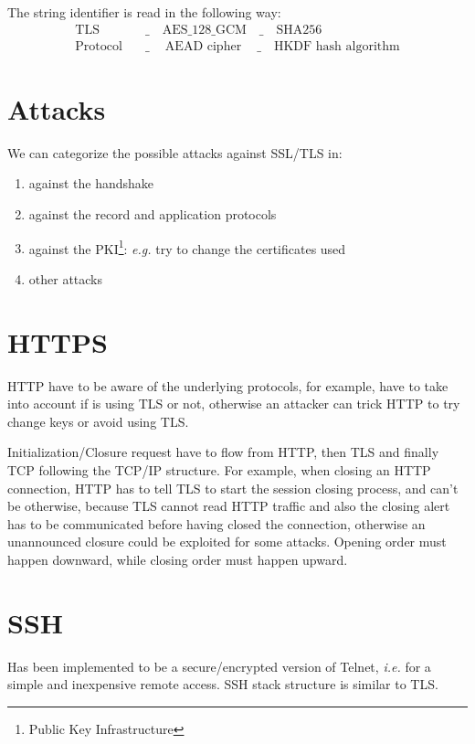 \documentclass[oneside]{academica}
\begin{document}
The string identifier is read in the following way:
\begin{align*}
  \text{TLS} \quad & \_ \quad \text{AES\_128\_GCM} \quad \_ \quad \text{SHA256} \\
  \text{Protocol} \quad & \_ \quad \ \text{AEAD cipher} \quad \ \_ \quad \text{HKDF hash algorithm}
\end{align*}

\section{Attacks}

We can categorize the possible attacks against SSL/TLS in:
\begin{enumerate}
  \item against the handshake
  \item against the record and application protocols
  \item against the PKI\footnote{Public Key Infrastructure}: \textit{e.g.} try to change the certificates used
  \item other attacks
\end{enumerate}

\section{HTTPS}

HTTP have to be aware of the underlying protocols, for example, have to take into account if is using TLS or not, otherwise an attacker can trick HTTP to try change keys or avoid using TLS.

Initialization/Closure request have to flow from HTTP, then TLS and finally TCP following the TCP/IP structure.
For example, when closing an HTTP connection, HTTP has to tell TLS to start the session closing process, and can't be otherwise, because TLS cannot read HTTP traffic and also the closing alert has to be communicated before having closed the connection, otherwise an unannounced closure could be exploited for some attacks.
Opening order must happen downward, while closing order must happen upward.

\section{SSH}

Has been implemented to be a secure/encrypted version of Telnet, \textit{i.e.} for a simple and inexpensive remote access.
SSH stack structure is similar to TLS.
\end{document}
